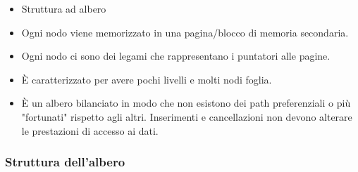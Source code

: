 \documentclass[a4paper]{article}
\begin{document}
\begin{itemize}
    \item Struttura ad albero
    \item Ogni nodo viene memorizzato in una pagina/blocco di memoria
    secondaria.
    \item Ogni nodo ci sono dei legami che rappresentano i puntatori alle pagine.
    \item È caratterizzato per avere pochi livelli e molti nodi foglia.
    \item È un albero bilanciato in modo che non esistono dei path preferenziali o
    più "fortunati" rispetto agli altri. Inserimenti e cancellazioni non devono alterare
    le prestazioni di accesso ai dati.
\end{itemize}

\subsubsection*{Struttura dell'albero}
\end{document}
